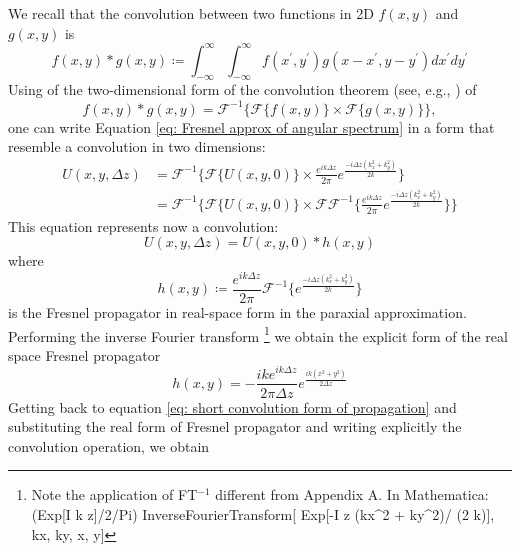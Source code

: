 \documentclass{iucr}              %
\newcommand{\ingreen}[1]{{\color{green}#1}}
\begin{document}
We recall that the convolution between two functions in 2D $f(x,y)$ and $g(x,y)$ is
\begin{equation}\label{eq: definition of convolution}
	f(x,y) * g(x,y) \coloneqq \int_{-\infty}^{\infty} \int_{-\infty}^{\infty} f(x^{\prime},y^{\prime})g(x-x^{\prime},y-y^{\prime})dx^{\prime}dy^{\prime}
\end{equation}
Using of the two-dimensional form of the convolution theorem (see, e.g., \cite{goodmanfourier}) of
\begin{equation}\label{eq: convolution theorem}
f(x,y) * g(x,y) = \mathcal{F}^{-1}\big\{{\mathcal{F}\{f(x,y)\} \times \mathcal{F}\{g(x,y)\}} \big\},
\end{equation}
one can write Equation \ref{eq: Fresnel approx of angular spectrum}  in a form that resemble a convolution in two dimensions:
\begin{align}\label{eq: convolution form of angular spectrum}
U(x, y, \Delta z) &= \mathcal{F}^{-1}\Big\{ \mathcal{F}\{U(x, y, 0)\} \times \frac{e^{i k \Delta z}}{2\pi} e^{\frac{-i \Delta z (k_x^2 + k_y^2) }{2k}} \Big\} \nonumber\\ 
&= \mathcal{F}^{-1}\Big\{ \mathcal{F}\{U(x, y, 0)\} \times \mathcal{F}\mathcal{F}^{-1}\Big\{  \frac{e^{i k \Delta z}}{2\pi} e^{\frac{-i \Delta z (k_x^2 + k_y^2) }{2k}} \Big \}\Big\}
\end{align} 
This equation represents now a convolution:
\begin{equation}\label{eq: short convolution form of propagation}
U(x, y, \Delta z) =U(x, y, 0) * h(x,y)
\end{equation} 
where 
\begin{equation}\label{eq: definition of Fresnel propagator}
h(x,y) \coloneqq \frac{e^{i k \Delta z}}{2\pi} \mathcal{F}^{-1}\Big \{e^{\frac{-i \Delta z (k_x^2 + k_y^2) }{2k}}\Big\}
\end{equation} 
is the Fresnel propagator in real-space form in the paraxial approximation. 
Performing the inverse Fourier transform \footnote{Note the application of FT$^{-1}$ different from Appendix A. \ingreen{In Mathematica:  (Exp[I k z]/2/Pi) InverseFourierTransform[
  Exp[-I z (kx^2 + ky^2)/ (2 k)], {kx, ky}, {x, y}]}
}
we obtain the explicit form of the real space Fresnel propagator
\begin{equation}\label{eq: real space Fresnel propagator}
h(x,y) = -\frac{i k e^{i k\Delta z}}{2\pi \Delta z} e^{\frac{i k(x^2+y^2)}{2\Delta z}}
\end{equation}
Getting back to equation \ref{eq: short convolution form of propagation} and substituting the real form of Fresnel propagator and writing explicitly the convolution operation, we obtain
\end{document}

